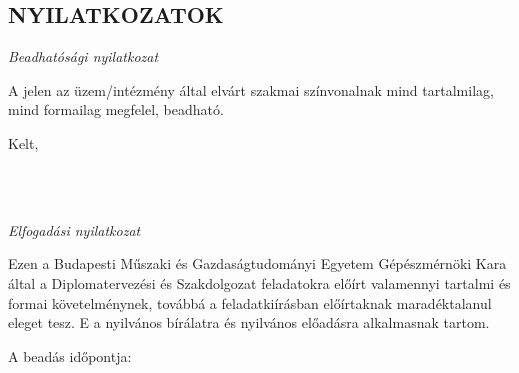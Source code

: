\selecthungarian
{}
\setcounter{page}{6}
\cleardoublepage %
\begin{center}
\section*{NYILATKOZATOK}
\end{center}

\vspace{0.5cm}

\begin{center}
\emph{Beadhatósági nyilatkozat}
\end{center}
A jelen \MakeLowercase{\gpkmunkatipusHU} az üzem/intézmény által elvárt szakmai színvonalnak mind tartalmilag, mind formailag megfelel, beadható.

\begin{flushleft}
Kelt,
\end{flushleft}

\begin{flushright}
 \\
 \vspace{0.5cm}
 \makebox[7cm]{\rule{6cm}{.4pt}}\\
\end{flushright}
\vspace{0.6cm}


\begin{center}
\emph{Elfogadási nyilatkozat}
\end{center}
Ezen \MakeLowercase{\gpkmunkatipusHU} a Budapesti Műszaki és Gazdaságtudományi Egyetem Gépészmérnöki Kara által a Diplomatervezési és Szakdolgozat feladatokra előírt valamennyi tartalmi és formai követelménynek, továbbá a feladatkiírásban előírtaknak maradéktalanul eleget tesz. E \MakeLowercase{\gpkmunkatipustHU} a nyilvános bírálatra és nyilvános előadásra alkalmasnak tartom.

\begin{flushleft}
A beadás időpontja:
\end{flushleft}

\begin{flushright}
 \makebox[7cm]{\rule{6cm}{.4pt}}\\
\end{flushright}
\vspace{0.6cm}

